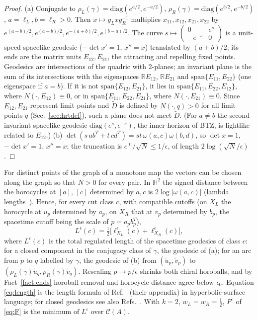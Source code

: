 \documentclass[aps,prd,onecolumn,superscriptaddress,nofootinbib,amsmath,amssymb,11pt]{revtex4-2}
\theoremstyle{definition}
\newcommand{\Hyp}{\mathbb{H}^2}
\newcommand{\R}{\mathbb{R}}
\newcommand{\Cut}{\mathcal{C}}
\newcommand{\eps}{\epsilon}
\newcommand{\Dt}{\tilde D}
\begin{document}
\begin{proof}
(a) Conjugate to $\rho_L(\gamma)=\mathrm{diag}(e^{a/2},e^{-a/2})$, $\rho_R(\gamma)=\mathrm{diag}(e^{b/2},e^{-b/2})$,
$a=\ell_L,b=\ell_R>0$. Then $x\mapsto g_Lxg_R^{-1}$ multiplies $x_{11},x_{12},x_{21},x_{22}$ by
$e^{(a-b)/2},e^{(a+b)/2},e^{-(a+b)/2},e^{(b-a)/2}$. The curve $s\mapsto\begin{pmatrix}0&e^s\\-e^{-s}&0\end{pmatrix}$ is a
unit-speed spacelike geodesic ($-\det x'=1$, $x''=x$) translated by $(a+b)/2$; its ends are the matrix units
$E_{12},E_{21}$, the attracting and repelling fixed points. Geodesics are intersections of the quadric with 2-planes;
an invariant plane is the sum of its intersections with the eigenspaces $\R E_{12}$, $\R E_{21}$ and
$\mathrm{span}\{E_{11},E_{22}\}$ (one eigenspace if $a=b$). If it is not $\mathrm{span}\{E_{12},E_{21}\}$, it lies in
$\mathrm{span}\{E_{11},E_{22},E_{12}\}$, where $N(\cdot,E_{12})\equiv0$, or in $\mathrm{span}\{E_{11},E_{22},E_{21}\}$, where
$N(\cdot,E_{21})\equiv0$. Since $E_{12},E_{21}$ represent limit points and $\Dt$ is defined by $N(\cdot,q)>0$ for all limit
points $q$ (Sec.~\ref{sec:hrtdef}), such a plane does not meet $\Dt$. (For $a\neq b$ the second invariant spacelike
geodesic $\mathrm{diag}(e^s,e^{-s})$, the inner horizon of BTZ, is lightlike related to $E_{12}$.)
(b) $\det(s\,ab^T+t\,cd^T)=st\,\omega(a,c)\omega(b,d)$, so $\det x=1$, $-\det x'=1$, $x''=x$; the truncation is
$e^{|t|}/\sqrt N\le1/\eps$, of length $2\log(\sqrt N/\eps)$.
\end{proof}

For distinct points of the graph of a monotone map the vectors can be chosen along the graph so that $N>0$ for every
pair. In $\Hyp$ the signed distance between the horocycles at $[a]$, $[c]$ determined by $a,c$ is $2\log|\omega(a,c)|$
(lambda lengths~\cite{Penner1987}). Hence, for every cut class $c$, with compatible cutoffs (on $X_L$ the horocycle at
$u_p$ determined by $a_p$, on $X_R$ that at $v_p$ determined by $b_p$, the spacetime cutoff being the scale of
$p=a_pb_p^T$),
\begin{equation}\label{eq:length}
L^\eps(c)=\tfrac12\big[\ell^\eps_{X_L}(c)+\ell^\eps_{X_R}(c)\big],
\end{equation}
where $L^\eps(c)$ is the total regulated length of the spacetime geodesics of class $c$: for a closed component in the
conjugacy class of $\gamma$, the geodesic of (a); for an arc from $p$ to $q$ labelled by $\gamma$, the geodesic of (b) from
$(\tilde u_p,\tilde v_p)$ to $(\rho_L(\gamma)\tilde u_q,\rho_R(\gamma)\tilde v_q)$. Rescaling $p\to p/\eps$ shrinks both chiral
horoballs, and by Fact~\ref{fact:ends} horoball removal and horocycle distance agree below $\eps_0$. Equation
\eqref{eq:length} is the length formula of Ref.~\cite{GGHH2025} (their appendix) in hyperbolic-surface language; for
closed geodesics see also Refs.~\cite{MazzoliViaggi2023,BonsanteSeppi2020}. With $k=2$, $w_L=w_R=\frac12$,
$F^\eps$ of \eqref{eq:F} is the minimum of $L^\eps$ over $\Cut(A)$.
\end{document}
